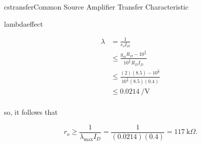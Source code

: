 \begin{mainquestion}{cstransfer}{Common Source Amplifier Transfer Characteristic}
\begin{partquestion}{lambdaeffect}
\begin{answer}
\begin{align*}
    \lambda &= \frac{1}{r_o I_D} \\
    &\leq \frac{g_m R_D - 10^\frac{6}{5}}{10^\frac{6}{5}R_D I_D} \\
    &\leq \frac{(2) (8.5) - 10^\frac{6}{5}}{10^\frac{6}{5}(8.5)(0.4)} \\
    &\leq \qty{0.0214}{\per\volt} \\
\end{align*}

so, it follows that

\[
r_{o} \geq \frac{1}{\lambda_{\max} I_{D}} = \frac{1}{(0.0214)(0.4)} = 117\ \text{k}\Omega.
\]
\end{answer}
\end{partquestion}

\end{mainquestion}

